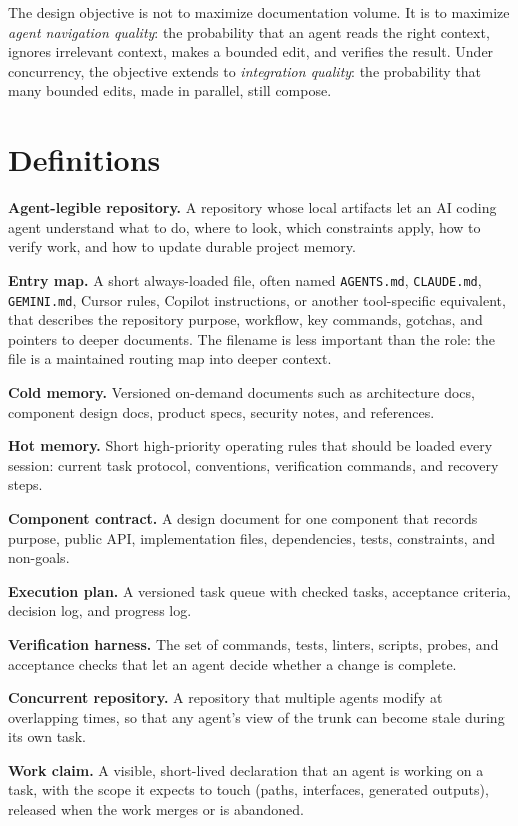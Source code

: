 \documentclass[11pt]{article}
\begin{document}
The design objective is not to maximize documentation volume. It is to maximize \emph{agent navigation quality}: the probability that an agent reads the right context, ignores irrelevant context, makes a bounded edit, and verifies the result. Under concurrency, the objective extends to \emph{integration quality}: the probability that many bounded edits, made in parallel, still compose.

\section{Definitions}
\textbf{Agent-legible repository.} A repository whose local artifacts let an AI coding agent understand what to do, where to look, which constraints apply, how to verify work, and how to update durable project memory.

\textbf{Entry map.} A short always-loaded file, often named \texttt{AGENTS.md}, \texttt{CLAUDE.md}, \texttt{GEMINI.md}, Cursor rules, Copilot instructions, or another tool-specific equivalent, that describes the repository purpose, workflow, key commands, gotchas, and pointers to deeper documents. The filename is less important than the role: the file is a maintained routing map into deeper context.

\textbf{Cold memory.} Versioned on-demand documents such as architecture docs, component design docs, product specs, security notes, and references.

\textbf{Hot memory.} Short high-priority operating rules that should be loaded every session: current task protocol, conventions, verification commands, and recovery steps.

\textbf{Component contract.} A design document for one component that records purpose, public API, implementation files, dependencies, tests, constraints, and non-goals.

\textbf{Execution plan.} A versioned task queue with checked tasks, acceptance criteria, decision log, and progress log.

\textbf{Verification harness.} The set of commands, tests, linters, scripts, probes, and acceptance checks that let an agent decide whether a change is complete.

\textbf{Concurrent repository.} A repository that multiple agents modify at overlapping times, so that any agent's view of the trunk can become stale during its own task.

\textbf{Work claim.} A visible, short-lived declaration that an agent is working on a task, with the scope it expects to touch (paths, interfaces, generated outputs), released when the work merges or is abandoned.
\end{document}
